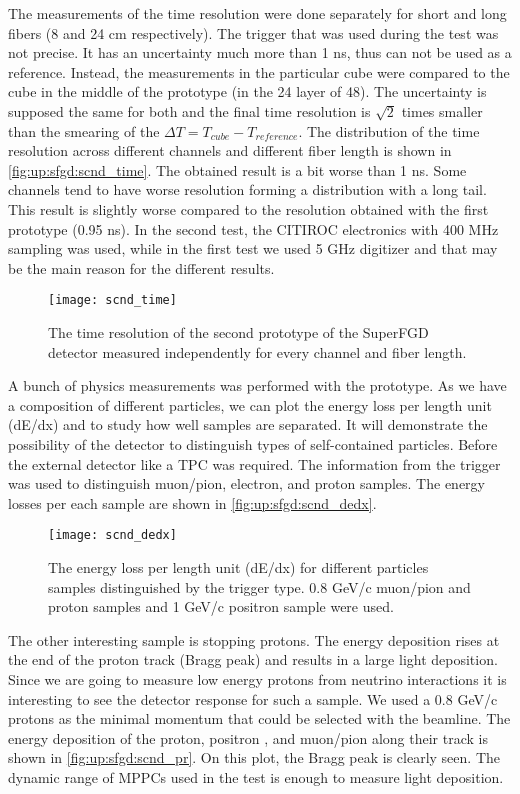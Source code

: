 \documentclass[main.tex]{subfiles}
\begin{document}
The measurements of the time resolution were done separately for short and long fibers (8 and 24 cm respectively). The trigger that was used during the test was not precise. It has an uncertainty much more than 1 ns, thus can not be used as a reference. Instead, the measurements in the particular cube were compared to the cube in the middle of the prototype (in the 24 layer of 48). The uncertainty is supposed the same for both and the final time resolution is $\sqrt{2}$ times smaller than the smearing of the $\Delta T=T_{cube}-T_{reference}$. The distribution of the time resolution across different channels and different fiber length is shown in \autoref{fig:up:sfgd:scnd_time}. The obtained result is a bit worse than 1 ns. Some channels tend to have worse resolution forming a distribution with a long tail. This result is slightly worse compared to the resolution obtained with the first prototype (0.95 ns). In the second test, the CITIROC electronics with 400 MHz sampling was used, while in the first test we used 5 GHz digitizer and that may be the main reason for the different results.

\begin{figure}[!ht]
	\centering
	\texttt{[image: scnd\_time]}
	\caption{The time resolution of the second prototype of the SuperFGD detector measured independently for every channel and fiber length.}
	\label{fig:up:sfgd:scnd_time}
\end{figure}

A bunch of physics measurements was performed with the prototype. As we have a composition of different particles, we can plot the energy loss per length unit (dE/dx) and to study how well samples are separated. It will demonstrate the possibility of the detector to distinguish types of self-contained particles. Before the external detector like a TPC was required. The information from the trigger was used to distinguish muon/pion, electron, and proton samples. The energy losses per each sample are shown in \autoref{fig:up:sfgd:scnd_dedx}.

\begin{figure}[!ht]
	\centering
	\texttt{[image: scnd\_dedx]}
	\caption{The energy loss per length unit (dE/dx) for different particles samples distinguished by the trigger type. 0.8 GeV/c muon/pion and proton samples and 1 GeV/c positron sample were used.}
	\label{fig:up:sfgd:scnd_dedx}
\end{figure}

The other interesting sample is stopping protons. The energy deposition rises at the end of the proton track (Bragg peak) and results in a large light deposition. Since we are going to measure low energy protons from neutrino interactions it is interesting to see the detector response for such a sample. We used a 0.8 GeV/c protons as the minimal momentum that could be selected with the beamline. The energy deposition of the proton, positron , and muon/pion along their track is shown in \autoref{fig:up:sfgd:scnd_pr}. On this plot, the Bragg peak is clearly seen. The dynamic range of MPPCs used in the test is enough to measure light deposition.
\end{document}
